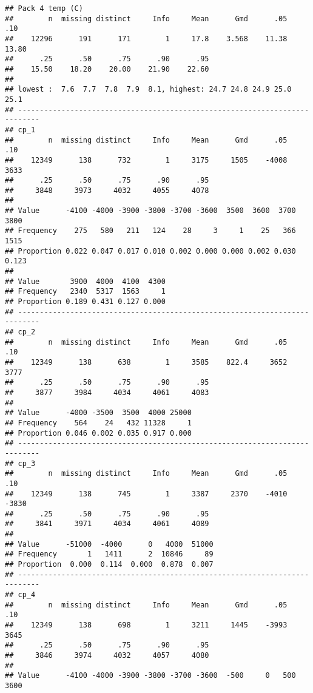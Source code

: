\documentclass[]{article}
\begin{document}
\begin{verbatim}
## Pack 4 temp (C) 
##        n  missing distinct     Info     Mean      Gmd      .05      .10 
##    12296      191      171        1     17.8    3.568    11.38    13.80 
##      .25      .50      .75      .90      .95 
##    15.50    18.20    20.00    21.90    22.60 
## 
## lowest :  7.6  7.7  7.8  7.9  8.1, highest: 24.7 24.8 24.9 25.0 25.1
## ---------------------------------------------------------------------------
## cp_1 
##        n  missing distinct     Info     Mean      Gmd      .05      .10 
##    12349      138      732        1     3175     1505    -4008     3633 
##      .25      .50      .75      .90      .95 
##     3848     3973     4032     4055     4078 
##                                                                       
## Value      -4100 -4000 -3900 -3800 -3700 -3600  3500  3600  3700  3800
## Frequency    275   580   211   124    28     3     1    25   366  1515
## Proportion 0.022 0.047 0.017 0.010 0.002 0.000 0.000 0.002 0.030 0.123
##                                   
## Value       3900  4000  4100  4300
## Frequency   2340  5317  1563     1
## Proportion 0.189 0.431 0.127 0.000
## ---------------------------------------------------------------------------
## cp_2 
##        n  missing distinct     Info     Mean      Gmd      .05      .10 
##    12349      138      638        1     3585    822.4     3652     3777 
##      .25      .50      .75      .90      .95 
##     3877     3984     4034     4061     4083 
##                                         
## Value      -4000 -3500  3500  4000 25000
## Frequency    564    24   432 11328     1
## Proportion 0.046 0.002 0.035 0.917 0.000
## ---------------------------------------------------------------------------
## cp_3 
##        n  missing distinct     Info     Mean      Gmd      .05      .10 
##    12349      138      745        1     3387     2370    -4010    -3830 
##      .25      .50      .75      .90      .95 
##     3841     3971     4034     4061     4089 
##                                              
## Value      -51000  -4000      0   4000  51000
## Frequency       1   1411      2  10846     89
## Proportion  0.000  0.114  0.000  0.878  0.007
## ---------------------------------------------------------------------------
## cp_4 
##        n  missing distinct     Info     Mean      Gmd      .05      .10 
##    12349      138      698        1     3211     1445    -3993     3645 
##      .25      .50      .75      .90      .95 
##     3846     3974     4032     4057     4080 
##                                                                       
## Value      -4100 -4000 -3900 -3800 -3700 -3600  -500     0   500  3600

\end{verbatim}
\end{document}
